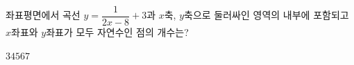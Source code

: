 \hspace*{2mm}\begin{minipage}[t]{\dimexpr\linewidth-2mm\relax}\vspace{0pt}
좌표평면에서 곡선 $y=\dfrac{1}{2x-8}+3$과 $x$축, $y$축으로 둘러싸인 영역의 내부에 포함되고 $x$좌표와 $y$좌표가 모두 자연수인 점의 개수는?
\begin{choices32}{$3$}{$4$}{$5$}{$6$}{$7$}\end{choices32}\end{minipage}
